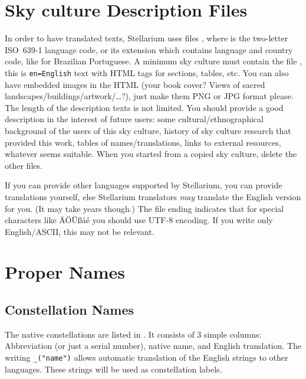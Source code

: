 \section{Sky culture Description Files}
\label{sec:skycultures:description}


In order to have translated texts, Stellarium uses files
, where  is the two-letter
ISO~639-1 language code, or its extension which contains language and
country code, like  for Brazilian Portuguese. A minimum
sky culture must contain the file , this is
\texttt{en=English} text with HTML tags for sections, tables,
etc. You can also have embedded images in the HTML (your book cover?
Views of sacred landscapes/buildings/artwork/\ldots?), just make them
PNG or JPG format please. The length of the description texts is not limited.
You should provide a good description in the interest of future users:
some cultural/ethnographical background of the users of this sky culture,
history of sky culture research that provided this work, tables of names/translations,
links to external resources, whatever seems suitable. When you started
from a copied sky culture, delete the other 
files.

If you can provide other languages supported by Stellarium, you can
provide translations yourself, else Stellarium translators \emph{may}
translate the English version for you. (It may take years though.) The file
ending  indicates that for special characters like ÄÖÜßáé
you should use UTF-8 encoding. If you write only English/ASCII, this may not
be relevant.

\section{Proper Names}
\label{sec:skycultures:names}

\subsection{Constellation Names}
\label{sec:skycultures:constellations}

The native constellations are listed in
. It consists of 3 simple columns:
Abbreviation (or just a serial number), native name, and English
translation. The writing \texttt{\_("name")} allows automatic
translation of the English strings to other languages. These strings
will be used as constellation labels.

